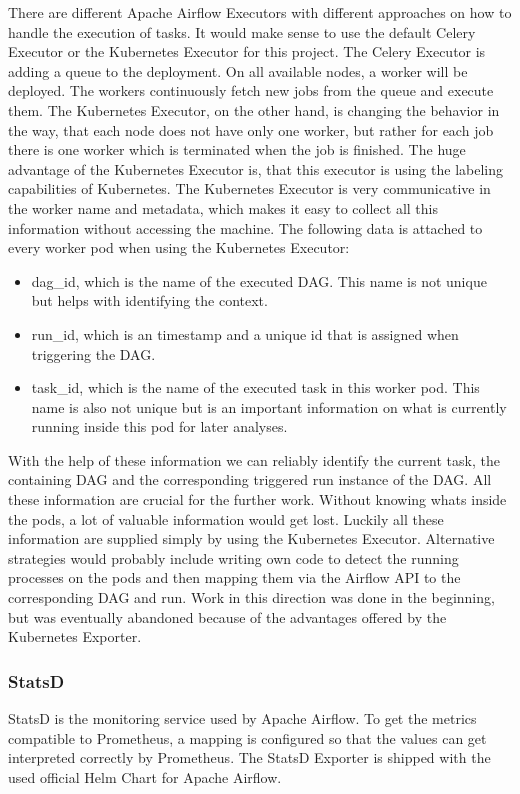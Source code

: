 \documentclass[a4paper,journal]{IEEEtran}
\begin{document}
	There are different Apache Airflow Executors with different approaches on how to handle the execution of tasks. It would make sense to use the default Celery Executor or the Kubernetes Executor for this project. The Celery Executor is adding a queue to the deployment. On all available nodes, a worker will be deployed. The workers continuously fetch new jobs from the queue and execute them.  The Kubernetes Executor, on the other hand, is changing the behavior in the way, that each node does not have only one worker, but rather for each job there is one worker which is terminated when the job is finished. The huge advantage of the Kubernetes Executor is, that this executor is using the labeling capabilities of Kubernetes. The Kubernetes Executor is very communicative in the worker name and metadata, which makes it easy to collect all this information without accessing the machine. \cite{airflowExecutor}\cite{airflowExecutorKubernetes} The following data is attached to every worker pod when using the Kubernetes Executor:
	\begin{itemize}
		\item dag\_id, which is the name of the executed DAG. This name is not unique but helps with identifying the context.
		\item run\_id, which is an timestamp and a unique id that is assigned when triggering the DAG.
		\item task\_id, which is the name of the executed task in this worker pod. This name is also not unique but is an important information on what is currently running inside this pod for later analyses.
	\end{itemize}
	
	With the help of these information we can reliably identify the current task, the containing DAG and the corresponding triggered run instance of the DAG. All these information are crucial for the further work. Without knowing whats inside the pods, a lot of valuable information would get lost. Luckily all these information are supplied simply by using the Kubernetes Executor. Alternative strategies would probably include writing own code to detect the running processes on the pods and then mapping them via the Airflow API to the corresponding DAG and run. Work in this direction was done in the beginning, but was eventually abandoned because of the advantages offered by the Kubernetes Exporter.
	
	\subsubsection{StatsD}
	StatsD is the monitoring service used by Apache Airflow. To get the metrics compatible to Prometheus, a mapping is configured so that the values can get interpreted correctly by Prometheus. The StatsD Exporter is shipped with the used official Helm Chart for Apache Airflow.
	
\end{document}
